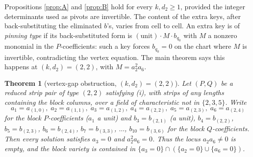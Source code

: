 \documentclass[11pt]{article}
\newtheorem{theorem}{Theorem}[section]
\theoremstyle{definition}
\theoremstyle{remark}
\begin{document}
Propositions \ref{prop:A} and \ref{prop:B} hold for every $k,d_2\geq 1$, provided the integer determinants used as pivots are invertible. The content of the extra keys, after back-substituting the eliminated $b$'s, varies from cell to cell. An extra key is of \emph{pinning type} if its back-substituted form is $(\text{unit})\cdot M\cdot b_{q_0}$ with $M$ a nonzero monomial in the $P$-coefficients: such a key forces $b_{q_0}=0$ on the chart where $M$ is invertible, contradicting the vertex equation. The main theorem says this happens at $(k,d_2)=(2,2)$, with $M=a_2^2a_6$.

\begin{theorem}[vertex-gap obstruction, $(k,d_2)=(2,2)$]\label{thm:22}
Let $(P,Q)$ be a reduced strip pair of type $(2,2)$ satisfying \textup{(i)}, with strips of any lengths containing the block columns, over a field of characteristic not in $\{2,3,5\}$. Write
\[
a_1=a_{(1,0)},\; a_2=a_{(1,1)},\; a_3=a_{(1,2)},\; a_4=a_{(2,2)},\; a_5=a_{(2,3)},\; a_6=a_{(2,4)}
\]
for the block $P$-coefficients ($a_1$ a unit) and $b_3=b_{(2,1)}$ (a unit), $b_4=b_{(2,2)}$, $b_5=b_{(2,3)}$, $b_6=b_{(2,4)}$, $b_7=b_{(3,3)}$, $\dots$, $b_{10}=b_{(3,6)}$ for the block $Q$-coefficients. Then every solution satisfies $a_3=0$ and $a_2^2a_6=0$. Thus the locus $a_2a_6\neq 0$ is empty, and the block variety is contained in $\{a_3=0\}\cap(\{a_2=0\}\cup\{a_6=0\})$.
\end{theorem}
\end{document}
